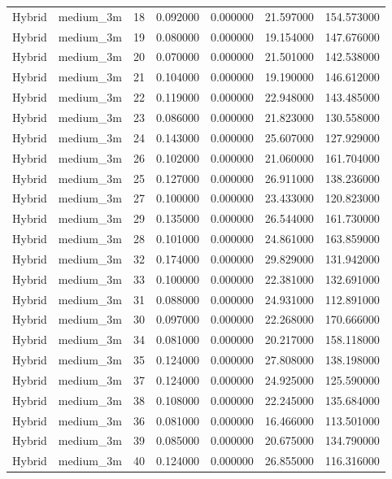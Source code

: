 \begin{tabular}{llrrrrr}
Hybrid & medium_3m & 18 & 0.092000 & 0.000000 & 21.597000 & 154.573000 \\
Hybrid & medium_3m & 19 & 0.080000 & 0.000000 & 19.154000 & 147.676000 \\
Hybrid & medium_3m & 20 & 0.070000 & 0.000000 & 21.501000 & 142.538000 \\
Hybrid & medium_3m & 21 & 0.104000 & 0.000000 & 19.190000 & 146.612000 \\
Hybrid & medium_3m & 22 & 0.119000 & 0.000000 & 22.948000 & 143.485000 \\
Hybrid & medium_3m & 23 & 0.086000 & 0.000000 & 21.823000 & 130.558000 \\
Hybrid & medium_3m & 24 & 0.143000 & 0.000000 & 25.607000 & 127.929000 \\
Hybrid & medium_3m & 26 & 0.102000 & 0.000000 & 21.060000 & 161.704000 \\
Hybrid & medium_3m & 25 & 0.127000 & 0.000000 & 26.911000 & 138.236000 \\
Hybrid & medium_3m & 27 & 0.100000 & 0.000000 & 23.433000 & 120.823000 \\
Hybrid & medium_3m & 29 & 0.135000 & 0.000000 & 26.544000 & 161.730000 \\
Hybrid & medium_3m & 28 & 0.101000 & 0.000000 & 24.861000 & 163.859000 \\
Hybrid & medium_3m & 32 & 0.174000 & 0.000000 & 29.829000 & 131.942000 \\
Hybrid & medium_3m & 33 & 0.100000 & 0.000000 & 22.381000 & 132.691000 \\
Hybrid & medium_3m & 31 & 0.088000 & 0.000000 & 24.931000 & 112.891000 \\
Hybrid & medium_3m & 30 & 0.097000 & 0.000000 & 22.268000 & 170.666000 \\
Hybrid & medium_3m & 34 & 0.081000 & 0.000000 & 20.217000 & 158.118000 \\
Hybrid & medium_3m & 35 & 0.124000 & 0.000000 & 27.808000 & 138.198000 \\
Hybrid & medium_3m & 37 & 0.124000 & 0.000000 & 24.925000 & 125.590000 \\
Hybrid & medium_3m & 38 & 0.108000 & 0.000000 & 22.245000 & 135.684000 \\
Hybrid & medium_3m & 36 & 0.081000 & 0.000000 & 16.466000 & 113.501000 \\
Hybrid & medium_3m & 39 & 0.085000 & 0.000000 & 20.675000 & 134.790000 \\
Hybrid & medium_3m & 40 & 0.124000 & 0.000000 & 26.855000 & 116.316000 \\

\end{tabular}
